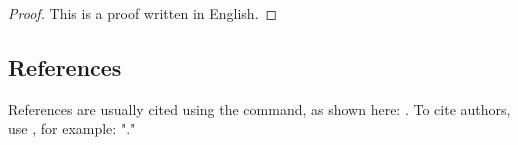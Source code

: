 \begin{proof}
    This is a proof written in English.
\end{proof}

\subsection{References}

References are usually cited using the  command, as shown here: \cite{Nicholas1998Handbook}. To cite authors, use , for example: "\citeauthor{goossens1994latex}."